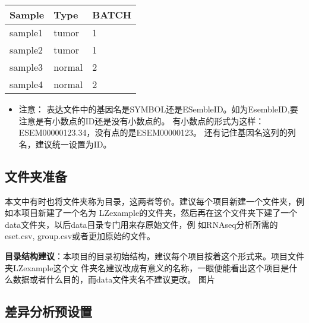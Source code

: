 \documentclass[
]{book}
\providecommand{\tightlist}{%
  \setlength{\itemsep}{0pt}\setlength{\parskip}{0pt}}
\begin{document}
\begin{longtable}[]{@{}lll@{}}
\toprule\noalign{}
Sample & Type & BATCH \\
\midrule\noalign{}
\endhead
\bottomrule\noalign{}
\endlastfoot
sample1 & tumor & 1 \\
sample2 & tumor & 1 \\
sample3 & normal & 2 \\
sample4 & normal & 2 \\
\end{longtable}

\begin{itemize}
\tightlist
\item
  注意：
  表达文件中的基因名是SYMBOL还是ESembleID。如为EsembleID,要注意是有小数点的ID还是没有小数点的。
  有小数点的形式为这样：ESEM00000123.34，没有点的是ESEM00000123。
  还有记住基因名这列的列名，建议统一设置为ID。
\end{itemize}

\subsection{文件夹准备}\label{ux6587ux4ef6ux5939ux51c6ux5907}

本文中有时也将文件夹称为目录，这两者等价。建议每个项目新建一个文件夹，例如本项目新建了一个名为
LZexample的文件夹，然后再在这个文件夹下建了一个data文件夹，以后data目录专门用来存原始文件，例
如RNAseq分析所需的eset.csv, group.csv或者更加原始的文件。

\textbf{目录结构建议}：本项目的目录初始结构，建议每个项目按着这个形式来。项目文件夹LZexample这个文
件夹名建议改成有意义的名称，一眼便能看出这个项目是什么数据或者什么目的，而data文件夹名不建议更改。
图片

\subsection{差异分析预设置}\label{ux5deeux5f02ux5206ux6790ux9884ux8bbeux7f6e}
\end{document}
